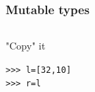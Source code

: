 \documentclass[colorlinks]{beamer}
\begin{document}
{

\begin{frame}[fragile]\frametitle{Mutable types}
\begin{columns}[T]
\begin{block}{"Copy" it}
\begin{verbatim}
>>> l=[32,10]
>>> r=l
\end{verbatim}

\end{block}
\end{columns}

\end{frame}
}
\end{document}
